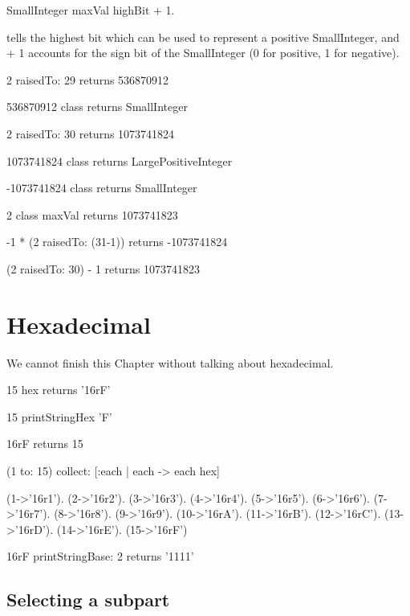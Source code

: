 \documentclass[a4paper,10pt,twoside]{book}
\begin{document}
\begin{code}
SmallInteger maxVal highBit + 1.
\end{code}

 tells the highest bit which can be used to
represent a positive SmallInteger, and + 1 accounts for the sign bit
of the SmallInteger (0 for positive, 1 for negative).



\begin{code}{}
2 raisedTo: 29 
	returns 536870912 

536870912 class
	returns SmallInteger

2 raisedTo: 30 
	returns 1073741824

1073741824 class
	returns LargePositiveInteger

-1073741824 class 
	returns SmallInteger

2 class maxVal 
	returns 1073741823

-1 * (2 raisedTo: (31-1)) 
	returns -1073741824
	
(2 raisedTo: 30) - 1
	returns 1073741823
\end{code}

\section{Hexadecimal}
We cannot finish this Chapter without talking about hexadecimal.

\begin{code}
15 hex
	returns '16rF'
	
15 printStringHex 'F'

16rF
	returns 15
\end{code}


\begin{code}
(1 to: 15) collect: [:each | each -> each hex] 

{(1->'16r1'). (2->'16r2'). (3->'16r3'). (4->'16r4'). (5->'16r5'). (6->'16r6'). (7->'16r7'). (8->'16r8'). (9->'16r9'). (10->'16rA'). (11->'16rB'). (12->'16rC'). (13->'16rD'). (14->'16rE'). (15->'16rF')}
\end{code}


\begin{code}{}
16rF printStringBase: 2
	returns '1111'
\end{code}


\subsection*{Selecting a subpart}
\end{document}
